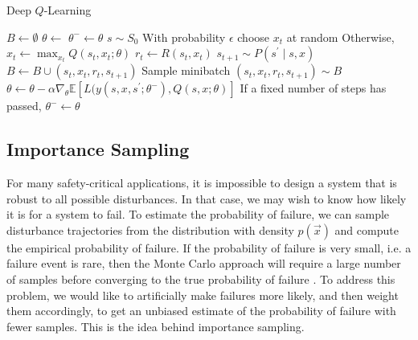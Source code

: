 \begin{algorithm}
\caption{Deep $Q$-Learning} \label{alg:dqn}
\begin{algorithmic}[1]
    \State $B \gets \emptyset$ \label{line:dqn_initialize_buffer}
    \State $\theta \gets$  \label{line:dqn_initialize_weights}
    \State $\theta^- \gets \theta$
    \Loop
        \State $s \sim S_0$ \label{line:dqn_sample_ic}
         \label{line:dqn_loop_episode}
            \State With probability $\epsilon$ choose $x_t$ at random \label{line:dqn_rand_action}
            \State Otherwise, $x_t \gets \max_{x_t} Q(s_t, x_t; \theta)$ \label{line:dqn_greedy_action}
            \State $r_t \gets R(s_t, x_t)$ \label{line:dqn_reward}
            \State $s_{t+1} \sim P(s^\prime \mid s, x)$ \label{line:dqn_next_state}
            \State $B \gets B \cup (s_t, x_t, r_t, s_{t+1})$ \label{line:dqn_save_in_replay_buffer}
            \State Sample minibatch $(s_t, x_t, r_t, s_{t+1}) \sim B$ \label{line:dqn_minibatch}
            \State $\theta \gets \theta - \alpha \nabla_{\theta} \mathbb{E}[L(y(s, x, s^\prime; \theta^-), Q(s,x; \theta)]$ \label{line:dqn_update}
            \State If a fixed number of steps has passed, $\theta^- \gets \theta$ \label{line:dqn_target_update}
        \EndWhile
    \EndLoop
    \State \Return{\theta} \label{line:dqn_return}
    \EndFunction
\end{algorithmic}
\end{algorithm}

\subsection{Importance Sampling}
\label{sec:is}
For many safety-critical applications, it is impossible to design a system that is robust to all possible disturbances. In that case, we may wish to know how likely it is for a system to fail. To estimate the probability of failure, we can sample disturbance trajectories from the distribution with density $p(\vec{x})$ and compute the empirical probability of failure. If the probability of failure is very small, i.e. a failure event is rare, then the Monte Carlo approach will require a large number of samples before converging to the true probability of failure \cite{hahn1972sample}. To address this problem, we would like to artificially make failures more likely, and then weight them accordingly, to get an unbiased estimate of the probability of failure with fewer samples. This is the idea behind importance sampling.

